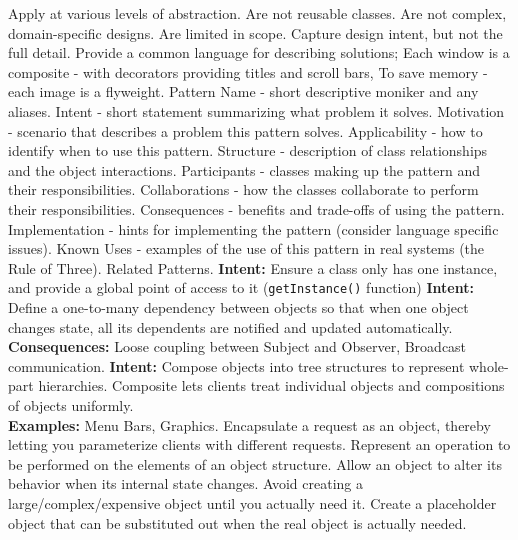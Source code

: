\documentclass[number]{assignment}
\begin{document}
\begin{landscape}
\begin{multicols}{3}
\small Apply at various levels of abstraction. Are not reusable classes. Are not complex, domain-specific designs. Are limited in scope. Capture design intent, but not the full detail.
\small Provide a common language for describing solutions; Each window is a composite - with decorators providing titles and scroll bars, To save memory - each image is a flyweight.
\small Pattern Name - short descriptive moniker and any aliases. Intent - short statement summarizing what problem it solves. Motivation - scenario that describes a problem this pattern solves. Applicability - how to identify when to use this pattern. Structure - description of class relationships and the object interactions. Participants - classes making up the pattern and their responsibilities. Collaborations - how the classes collaborate to perform their responsibilities. Consequences - benefits and trade-offs of using the pattern. Implementation - hints for implementing the pattern (consider language specific issues). Known Uses - examples of the use of this pattern in real systems (the Rule of Three). Related Patterns.
\small\textbf{Intent:} Ensure a class only has one instance, and provide a global point of access to it (\texttt{getInstance()} function)
\small\textbf{Intent:} Define a one-to-many dependency between objects so that when one object changes state, all its dependents are notified and updated automatically.\\
\small\textbf{Consequences:} Loose coupling between Subject and Observer, Broadcast communication.
\small\textbf{Intent:} Compose objects into tree structures to represent whole-part hierarchies. Composite lets clients treat individual objects and compositions of objects uniformly.\\
\small\textbf{Examples:} Menu Bars, Graphics.
\small Encapsulate a request as an object, thereby letting you parameterize clients with different requests.
\small Represent an operation to be performed on the elements of an object structure.
\small Allow an object to alter its behavior when its internal state changes.
\small Avoid creating a large/complex/expensive object until you actually need it. Create a placeholder object that can be substituted out when the real object is actually needed.\\

\end{multicols}
\end{landscape}
\end{document}
